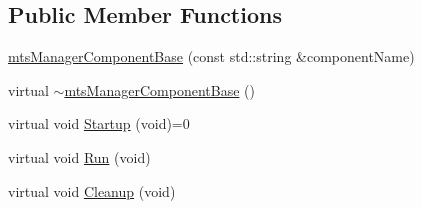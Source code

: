 \subsection*{Public Member Functions}
\begin{DoxyCompactItemize}
\item 
\hyperlink{classmts_manager_component_base_a6f529c7d9680d417f93fbc3ba77c30f8}{mts\-Manager\-Component\-Base} (const std\-::string \&component\-Name)
\item 
virtual \hyperlink{classmts_manager_component_base_a34fa59402e78af5ee0dc1ba97ac347ce}{$\sim$mts\-Manager\-Component\-Base} ()
\item 
virtual void \hyperlink{classmts_manager_component_base_ab5602d8195e8431db97805055032fa1b}{Startup} (void)=0
\item 
virtual void \hyperlink{classmts_manager_component_base_a833777d244564494fbfaed685e2b543d}{Run} (void)
\item 
virtual void \hyperlink{classmts_manager_component_base_ae893671d98413773200cae361eac2071}{Cleanup} (void)
\end{DoxyCompactItemize}

